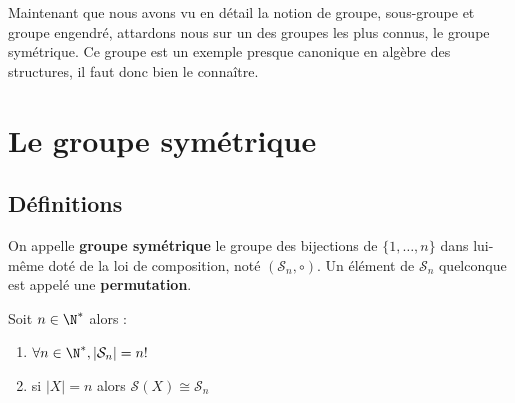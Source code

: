 
\minitoc  %

Maintenant que nous avons vu en détail la notion de groupe, sous-groupe et groupe engendré, 
attardons nous sur un des groupes les plus connus, le groupe symétrique. 
Ce groupe est un exemple presque canonique en algèbre des structures, il faut donc bien le connaître. 


\section{Le groupe symétrique}

\subsection{Définitions}

\begin{definition}
	On appelle \textbf{groupe symétrique} le groupe des bijections de $\{1, \dots ,n\}$ dans lui-même doté de la loi de composition, noté $(\mathcal{S}_n,\circ)$.
	Un élément de $\mathcal{S}_n$ quelconque est appelé une \textbf{permutation}.
\end{definition} 

\begin{prop}
	Soit $n \in \N^*$ alors :
	\begin{enumerate}
		\item $ \forall n \in \N^*, |\mathcal{S}_n| = n ! $
		\item si $ |X| = n $ alors $ \mathcal{S}(X) \cong \mathcal{S}_n $
	\end{enumerate}
\end{prop}

